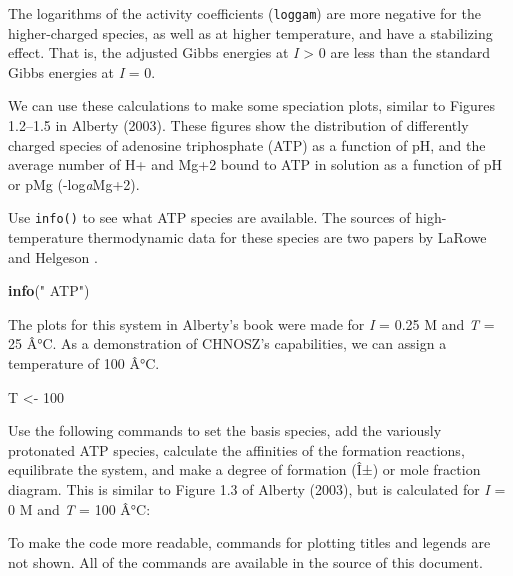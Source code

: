 \documentclass[]{tufte-handout}
\newenvironment{Shaded}{}{}
\newcommand{\KeywordTok}[1]{\textcolor[rgb]{0.00,0.44,0.13}{\textbf{#1}}}
\newcommand{\DecValTok}[1]{\textcolor[rgb]{0.25,0.63,0.44}{#1}}
\newcommand{\StringTok}[1]{\textcolor[rgb]{0.25,0.44,0.63}{#1}}
\newcommand{\NormalTok}[1]{#1}
\begin{document}
The logarithms of the activity coefficients (\texttt{loggam}) are more
negative for the higher-charged species, as well as at higher
temperature, and have a stabilizing effect. That is, the adjusted Gibbs
energies at \emph{I} \textgreater{} 0 are less than the standard Gibbs
energies at \emph{I} = 0.

We can use these calculations to make some speciation plots, similar to
Figures 1.2--1.5 in Alberty (2003). These figures show the distribution
of differently charged species of adenosine triphosphate (ATP) as a
function of pH, and the average number of H+ and Mg+2 bound to ATP in
solution as a function of pH or pMg (-log\emph{a}Mg+2).

Use {\texttt{info()}} to see what ATP species are available. The sources
of high-temperature thermodynamic data for these species are two papers
by LaRowe and Helgeson \citetext{\citeyear{LH06a}; \citeyear{LH06b}}.

\begin{Shaded}
\begin{Highlighting}[]
\KeywordTok{info}\NormalTok{(}\StringTok{" ATP"}\NormalTok{)}
\end{Highlighting}
\end{Shaded}

The plots for this system in Alberty's book were made for \emph{I} =
0.25 M and \emph{T} = 25 Â°C. As a demonstration of CHNOSZ's
capabilities, we can assign a temperature of 100 Â°C.

\begin{Shaded}
\begin{Highlighting}[]
\NormalTok{T <-}\StringTok{ }\DecValTok{100}
\end{Highlighting}
\end{Shaded}

Use the following commands to set the basis species, add the variously
protonated ATP species, calculate the affinities of the formation
reactions, equilibrate the system, and make a degree of formation (Î±)
or mole fraction diagram. This is similar to Figure 1.3 of Alberty
(2003), but is calculated for \emph{I} = 0 M and \emph{T} = 100 Â°C:

\begin{marginfigure}
To make the code more readable, commands for plotting titles and legends
are not shown. All of the commands are available in the source of this
document.
\end{marginfigure}
\end{document}
